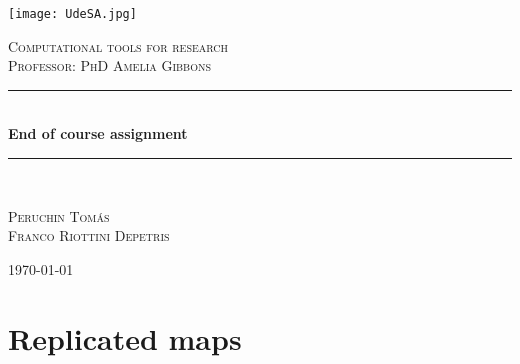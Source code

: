 \documentclass[a4paper,11pt]{article}
\begin{document}
\begin{titlepage} %
	\newcommand{\HRule}{\rule{\linewidth}{0.5mm}} %
	
	\center %
	
	\texttt{[image: UdeSA.jpg]}
	
	\textsc{\Large Computational tools for research }\\[0.5cm] %
	
	\textsc{\large Professor: PhD Amelia Gibbons}\\
	\vspace{0,15cm}
	\vspace{4pt}
	\textcolor{white}{\HRule}\\[0.6cm]
	\huge\bfseries End of course assignment
	\textcolor{white}{\HRule}\\[1.5cm]
	\begin{center}
		\large
		\textsc{Peruchin Tomás}\\
		\textsc{Franco Riottini Depetris}\\
	\end{center}
	
	
	\vfill\vfill\vfill %
	{\large \today}
	\vfill
	
\end{titlepage}


\newpage
\onehalfspacing

\section*{\textcolor{officegreen}{Replicated maps}}
\end{document}
